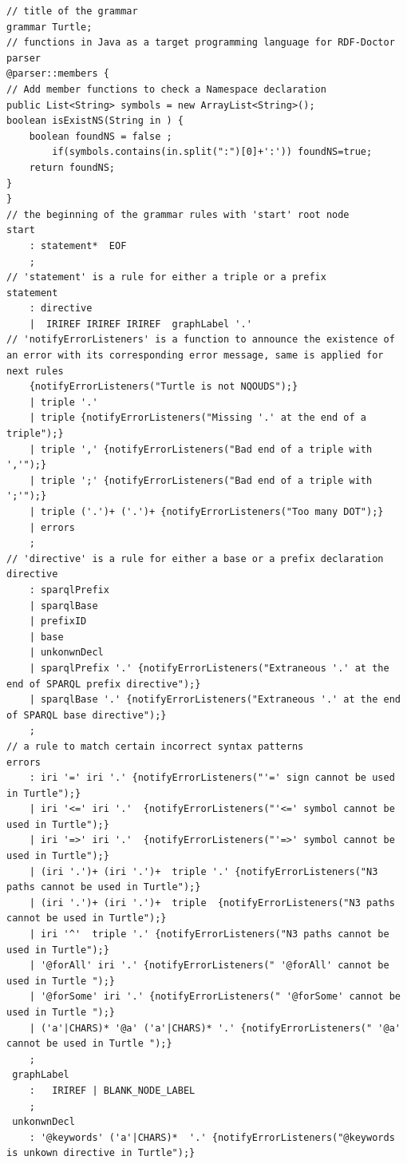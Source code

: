 \begin{appendices}
\begin{lstlisting}
// title of the grammar
grammar Turtle;
// functions in Java as a target programming language for RDF-Doctor parser
@parser::members { 
// Add member functions to check a Namespace declaration
public List<String> symbols = new ArrayList<String>();
boolean isExistNS(String in ) { 
	boolean foundNS = false ; 
		if(symbols.contains(in.split(":")[0]+':')) foundNS=true;
	return foundNS;
}
}
// the beginning of the grammar rules with 'start' root node
start
    : statement*  EOF
    ;
// 'statement' is a rule for either a triple or a prefix
statement
    : directive
    |  IRIREF IRIREF IRIREF  graphLabel '.'
// 'notifyErrorListeners' is a function to announce the existence of an error with its corresponding error message, same is applied for next rules
    {notifyErrorListeners("Turtle is not NQOUDS");}
    | triple '.'
    | triple {notifyErrorListeners("Missing '.' at the end of a triple");}
    | triple ',' {notifyErrorListeners("Bad end of a triple with ','");}
    | triple ';' {notifyErrorListeners("Bad end of a triple with ';'");}
    | triple ('.')+ ('.')+ {notifyErrorListeners("Too many DOT");}
    | errors		
    ;
// 'directive' is a rule for either a base or a prefix declaration
directive
    : sparqlPrefix
    | sparqlBase 
    | prefixID   
    | base
    | unkonwnDecl
    | sparqlPrefix '.' {notifyErrorListeners("Extraneous '.' at the end of SPARQL prefix directive");}
    | sparqlBase '.' {notifyErrorListeners("Extraneous '.' at the end of SPARQL base directive");}
    ;
// a rule to match certain incorrect syntax patterns
errors	
    : iri '=' iri '.' {notifyErrorListeners("'=' sign cannot be used in Turtle");}
 	| iri '<=' iri '.'  {notifyErrorListeners("'<=' symbol cannot be used in Turtle");}
    | iri '=>' iri '.'  {notifyErrorListeners("'=>' symbol cannot be used in Turtle");}
 	| (iri '.')+ (iri '.')+  triple '.' {notifyErrorListeners("N3 paths cannot be used in Turtle");}
    | (iri '.')+ (iri '.')+  triple  {notifyErrorListeners("N3 paths cannot be used in Turtle");}
    | iri '^'  triple '.' {notifyErrorListeners("N3 paths cannot be used in Turtle");}
    | '@forAll' iri '.' {notifyErrorListeners(" '@forAll' cannot be used in Turtle ");}
    | '@forSome' iri '.' {notifyErrorListeners(" '@forSome' cannot be used in Turtle ");}
    | ('a'|CHARS)* '@a' ('a'|CHARS)* '.' {notifyErrorListeners(" '@a' cannot be used in Turtle ");}
    ;
 graphLabel
 	: 	IRIREF | BLANK_NODE_LABEL
 	;
 unkonwnDecl 	
    : '@keywords' ('a'|CHARS)*  '.' {notifyErrorListeners("@keywords is unkown directive in Turtle");}

\end{lstlisting}
\end{appendices}
